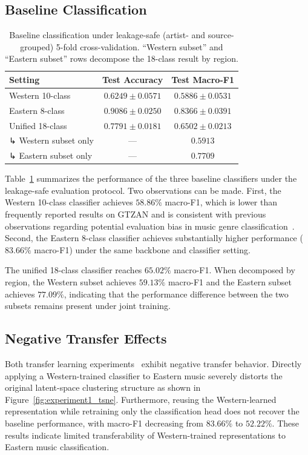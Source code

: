 \documentclass{article}
\begin{document}
\subsection{Baseline Classification}
\begin{table}[h]
\centering
\caption{Baseline classification under leakage-safe (artist- and
source-grouped) 5-fold cross-validation. ``Western subset'' and
``Eastern subset'' rows decompose the 18-class result by region.}
\label{tab:baselines}
\small
\begin{tabular}{lcc}
\toprule
\textbf{Setting} & \textbf{Test Accuracy} & \textbf{Test Macro-F1} \\
\midrule
Western 10-class & $0.6249 \pm 0.0571$ & $0.5886 \pm 0.0531$ \\
Eastern 8-class  & $0.9086 \pm 0.0250$ & $0.8366 \pm 0.0391$ \\
Unified 18-class & $0.7791 \pm 0.0181$ & $0.6502 \pm 0.0213$ \\
\quad ↳ Western subset only & --- & $0.5913$ \\
\quad ↳ Eastern subset only & --- & $0.7709$ \\
\bottomrule
\end{tabular}
\end{table}
Table~\ref{tab:baselines} summarizes the performance of the three baseline classifiers under the leakage-safe evaluation protocol. Two observations can be made. First, the Western 10-class classifier achieves $58.86\%$ macro-F1, which is lower than frequently reported results on GTZAN and is consistent with previous observations regarding potential evaluation bias in music genre classification~\citep{flexer2007closer}. Second, the Eastern 8-class classifier achieves substantially higher performance ($83.66\%$ macro-F1) under the same backbone and classifier setting.

The unified 18-class classifier reaches $65.02\%$ macro-F1. When decomposed by region, the Western subset achieves $59.13\%$ macro-F1 and the Eastern subset achieves $77.09\%$, indicating that the performance difference between the two subsets remains present under joint training.

\subsection{Negative Transfer Effects}

Both transfer learning experiments~\citep{pan2009survey,choi2017transfer} exhibit negative transfer behavior. Directly applying a Western-trained classifier to Eastern music severely distorts the original latent-space clustering structure as shown in Figure~\ref{fig:experiment1_tsne}. Furthermore, reusing the Western-learned representation while retraining only the classification head does not recover the baseline performance, with macro-F1 decreasing from $83.66\%$ to $52.22\%$. These results indicate limited transferability of Western-trained representations to Eastern music classification.
\end{document}
